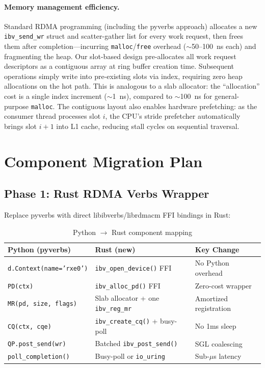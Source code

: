 \documentclass[11pt,letterpaper]{article}
\begin{document}
\paragraph{Memory management efficiency.}
Standard RDMA programming (including the pyverbs approach) allocates a new \texttt{ibv\_send\_wr} struct and scatter-gather list for every work request, then frees them after completion---incurring \texttt{malloc}/\texttt{free} overhead (${\sim}$50--100~ns each) and fragmenting the heap. Our slot-based design pre-allocates all work request descriptors as a contiguous array at ring buffer creation time. Subsequent operations simply write into pre-existing slots via index, requiring zero heap allocations on the hot path. This is analogous to a slab allocator: the ``allocation'' cost is a single index increment (${\sim}$1~ns), compared to ${\sim}$100~ns for general-purpose \texttt{malloc}. The contiguous layout also enables hardware prefetching: as the consumer thread processes slot $i$, the CPU's stride prefetcher automatically brings slot $i+1$ into L1 cache, reducing stall cycles on sequential traversal.

\section{Component Migration Plan}

\subsection{Phase 1: Rust RDMA Verbs Wrapper}

Replace pyverbs with direct libibverbs/librdmacm FFI bindings in Rust:

\begin{table}[htbp]
\centering
\caption{Python $\to$ Rust component mapping}
\label{tab:migration-mapping}
\begin{tabular}{@{}lll@{}}
\toprule
\textbf{Python (pyverbs)} & \textbf{Rust (new)} & \textbf{Key Change} \\
\midrule
\texttt{d.Context(name='rxe0')} & \texttt{ibv\_open\_device()} FFI & No Python overhead \\
\texttt{PD(ctx)} & \texttt{ibv\_alloc\_pd()} FFI & Zero-cost wrapper \\
\texttt{MR(pd, size, flags)} & Slab allocator + one \texttt{ibv\_reg\_mr} & Amortized registration \\
\texttt{CQ(ctx, cqe)} & \texttt{ibv\_create\_cq()} + busy-poll & No 1ms sleep \\
\texttt{QP.post\_send(wr)} & Batched \texttt{ibv\_post\_send()} & SGL coalescing \\
\texttt{poll\_completion()} & Busy-poll or \texttt{io\_uring} & Sub-$\mu$s latency \\
\bottomrule
\end{tabular}
\end{table}
\end{document}
